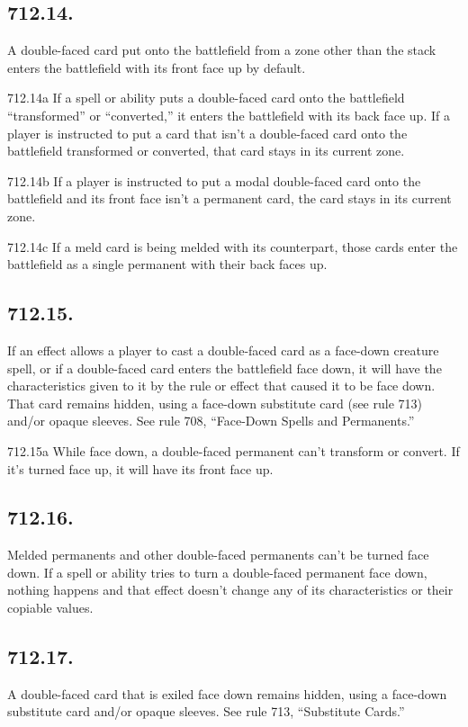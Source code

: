 \subsection*{712.14.}
A double-faced card put onto the battlefield from a zone other than the stack enters the battlefield with its front face up by default.

712.14a If a spell or ability puts a double-faced card onto the battlefield “transformed” or “converted,” it enters the battlefield with its back face up. If a player is instructed to put a card that isn’t a double-faced card onto the battlefield transformed or converted, that card stays in its current zone.

712.14b If a player is instructed to put a modal double-faced card onto the battlefield and its front face isn’t a permanent card, the card stays in its current zone.

712.14c If a meld card is being melded with its counterpart, those cards enter the battlefield as a single permanent with their back faces up.

\subsection*{712.15.}
If an effect allows a player to cast a double-faced card as a face-down creature spell, or if a double-faced card enters the battlefield face down, it will have the characteristics given to it by the rule or effect that caused it to be face down. That card remains hidden, using a face-down substitute card (see rule 713) and/or opaque sleeves. See rule 708, “Face-Down Spells and Permanents.”

712.15a While face down, a double-faced permanent can’t transform or convert. If it’s turned face up, it will have its front face up.

\subsection*{712.16.}
Melded permanents and other double-faced permanents can’t be turned face down. If a spell or ability tries to turn a double-faced permanent face down, nothing happens and that effect doesn’t change any of its characteristics or their copiable values.

\subsection*{712.17.}
A double-faced card that is exiled face down remains hidden, using a face-down substitute card and/or opaque sleeves. See rule 713, “Substitute Cards.”

